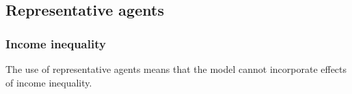 
\subsection{Representative agents}

\subsubsection{Income inequality}

The use of representative agents means that the model cannot incorporate effects of income inequality.

